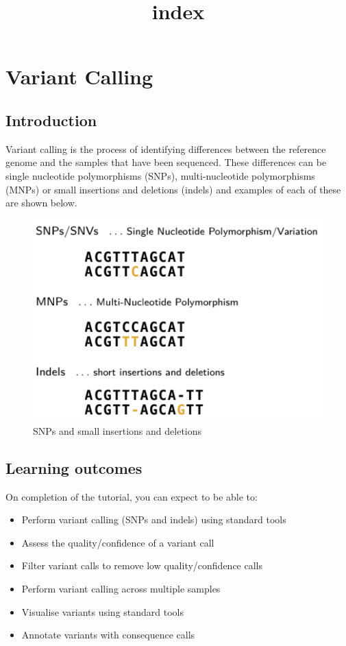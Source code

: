 \documentclass[11pt]{article}
\title{index}
\providecommand{\tightlist}{%
      \setlength{\itemsep}{0pt}\setlength{\parskip}{0pt}}
\begin{document}
    \hypertarget{variant-calling}{%
\section{Variant Calling}\label{variant-calling}}

\hypertarget{introduction}{%
\subsection{Introduction}\label{introduction}}

Variant calling is the process of identifying differences between the
reference genome and the samples that have been sequenced. These
differences can be single nucleotide polymorphisms (SNPs),
multi-nucleotide polymorphisms (MNPs) or small insertions and deletions
(indels) and examples of each of these are shown below.

    \begin{figure}[!h]
\centering
\includegraphics{images/snps-and-indels.png}
\caption{SNPs and small insertions and deletions}
\end{figure}

    \hypertarget{learning-outcomes}{%
\subsection{Learning outcomes}\label{learning-outcomes}}

On completion of the tutorial, you can expect to be able to:

\begin{itemize}
\tightlist
\item
  Perform variant calling (SNPs and indels) using standard tools
\item
  Assess the quality/confidence of a variant call
\item
  Filter variant calls to remove low quality/confidence calls
\item
  Perform variant calling across multiple samples
\item
  Visualise variants using standard tools
\item
  Annotate variants with consequence calls
\end{itemize}
\end{document}
